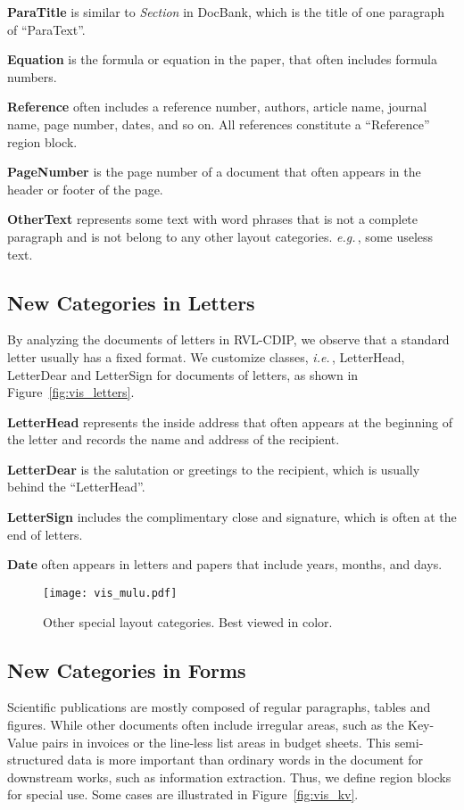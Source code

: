 \documentclass[10pt,twocolumn,letterpaper]{article}
\def\eg{\emph{e.g.}\,}
\def\ie{\emph{i.e.}\,}
\begin{document}
\noindent
\textbf{ParaTitle} is similar to \textit{Section} in DocBank, which is the title of one paragraph of ``ParaText''.


\noindent
\textbf{Equation} is the formula or equation in the paper, that often includes formula numbers.

\noindent
\textbf{Reference} often includes a reference number, authors, article name,  journal name, page number, dates, and so on.
All references constitute a ``Reference'' region block.

\noindent
\textbf{PageNumber} is the page number of a document that often appears in the header or footer of the page.

\noindent
\textbf{OtherText} represents some text with word phrases that is not a complete paragraph and is not belong to any other layout categories.
\eg, some useless text.


\subsection{New Categories in Letters} 
By analyzing the documents of letters in RVL-CDIP,  we observe that a standard letter usually has a fixed format.
We customize  classes, \ie, LetterHead, LetterDear and LetterSign for documents of letters, as shown in Figure~\ref{fig:vis_letters}.

\noindent
\textbf{LetterHead} represents the inside address that often appears at the beginning of the letter and records the name and address of the recipient.

\noindent
\textbf{LetterDear} is the salutation or greetings to the recipient, which is usually behind the ``LetterHead''.

\noindent
\textbf{LetterSign} includes the complimentary close and signature, which is often at the end of letters.

\noindent
\textbf{Date} often appears in letters and papers that include years, months, and days.

\begin{figure}[!htp]\centering
\texttt{[image: vis\_mulu.pdf]}
\caption{Other special layout categories. Best viewed in color.}
 \label{fig:vis_mulu}
\end{figure} 

\subsection{New Categories in Forms} 
Scientific publications are mostly composed of regular paragraphs, tables and figures.
While other documents often include irregular areas, such as the Key-Value pairs in  invoices or the line-less list areas in budget sheets.
This semi-structured data is more important than ordinary words in the document for downstream works, such as information extraction.
Thus, we define  region blocks for special use.
Some cases are illustrated in Figure~\ref{fig:vis_kv}.
\end{document}
